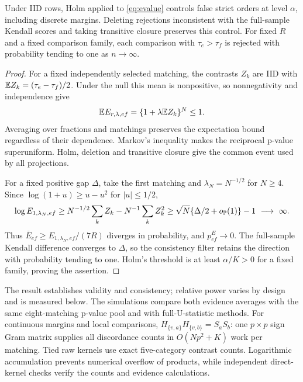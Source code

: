 \begin{proposition}\label{prop:evalues}
Under IID rows, Holm applied to \eqref{eq:evalue} controls false strict orders at level $\alpha$, including discrete margins. Deleting rejections inconsistent with the full-sample Kendall scores and taking transitive closure preserves this control. For fixed $R$ and a fixed comparison family, each comparison with $\tau_e>\tau_f$ is rejected with probability tending to one as $n\to\infty$.
\end{proposition}
\begin{proof}
For a fixed independently selected matching, the contrasts $Z_k$ are IID with $\mathbb E Z_k=(\tau_e-\tau_f)/2$. Under the null this mean is nonpositive, so nonnegativity and independence give
\[
 \mathbb E E_{r,\lambda,ef}=\{1+\lambda\mathbb E Z_k\}^N\le1.
\]
Averaging over fractions and matchings preserves the expectation bound regardless of their dependence. Markov's inequality makes the reciprocal p-value superuniform. Holm, deletion and transitive closure give the common event used by all projections.

For a fixed positive gap $\Delta$, take the first matching and $\lambda_N=N^{-1/2}$ for $N\ge4$. Since $\log(1+u)\ge u-u^2$ for $|u|\le1/2$,
\[
 \log E_{1,\lambda_N,ef}\ge N^{-1/2}\sum_k Z_k-N^{-1}\sum_kZ_k^2
 \ge \sqrt N\{\Delta/2+o_{\mathbb P}(1)\}-1\ \longrightarrow\ \infty.
\]
Thus $\overline E_{ef}\ge E_{1,\lambda_N,ef}/(7R)$ diverges in probability, and $p^E_{ef}\to0$. The full-sample Kendall difference converges to $\Delta$, so the consistency filter retains the direction with probability tending to one. Holm's threshold is at least $\alpha/K>0$ for a fixed family, proving the assertion.
\end{proof}
The result establishes validity and consistency; relative power varies by design and is measured below. The simulations compare both evidence averages with the same eight-matching p-value pool and with full-U-statistic methods. For continuous margins and local comparisons, $H_{\{v,a\}}H_{\{v,b\}}=S_aS_b$: one $p\times p$ sign Gram matrix supplies all discordance counts in $O(Np^2+K)$ work per matching. Tied raw kernels use exact five-category contrast counts. Logarithmic accumulation prevents numerical overflow of products, while independent direct-kernel checks verify the counts and evidence calculations.

